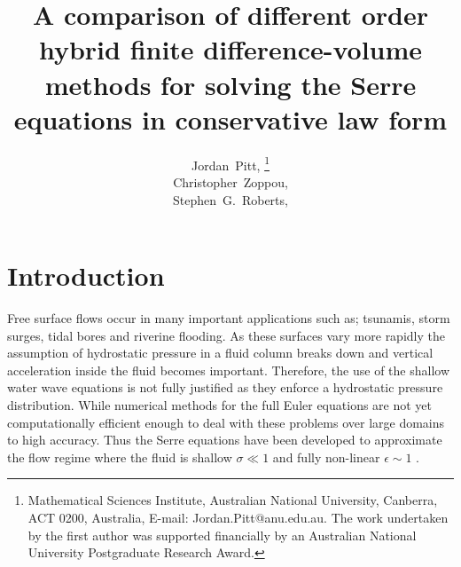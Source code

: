 \documentclass[SingleSpace,12pt]{Serre_ASCE}
\begin{document}
\title{A comparison of different order hybrid finite difference-volume methods for solving the Serre equations in conservative law form}

\author{
Jordan~Pitt,%
\thanks{Mathematical Sciences Institute, Australian National University, Canberra, ACT 0200, Australia, E-mail: Jordan.Pitt@anu.edu.au. The work undertaken by the first author was supported financially by an Australian National University Postgraduate Research Award.}
\\
Christopher~Zoppou,\footnotemark[1]%
%
\\
Stephen~G.~Roberts,\footnotemark[1]
}

\maketitle

\begin{abstract}

\end{abstract}


\linenumbers

\section{Introduction} \label{intro}
Free surface flows occur in many important applications such as; tsunamis, storm surges, tidal bores and riverine flooding. As these surfaces vary more rapidly the assumption of hydrostatic pressure in a fluid column breaks down and vertical acceleration inside the fluid becomes important. Therefore, the use of the shallow water wave equations is not fully justified as they enforce a hydrostatic pressure distribution. While numerical methods for the full Euler equations are not yet computationally efficient enough to deal with these problems over large domains to high accuracy. Thus the Serre equations have been developed to approximate the flow regime where the fluid is shallow $\sigma \ll 1$ and fully non-linear $\epsilon \sim 1$ \cite{Bonneton-Lannes-2009-16601}. 
\end{document}
